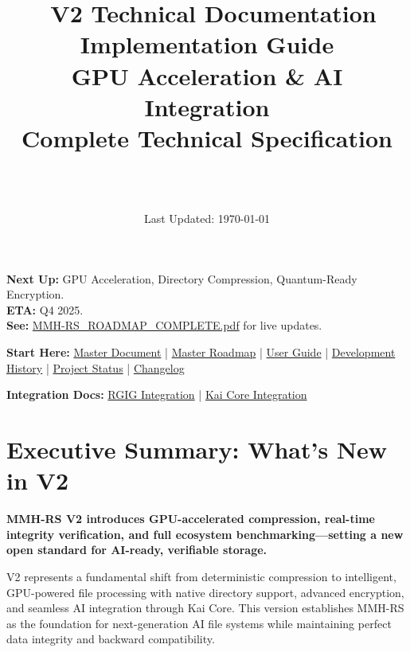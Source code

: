 \documentclass[12pt,a4paper]{article}
\title{\Huge\textbf{\project\ V2 Technical Documentation}\\[0.5cm]
\Large\textbf{Implementation Guide}\\[0.3cm]
\large GPU Acceleration \& AI Integration\\[0.5cm]
\large Complete Technical Specification}
\author{\Large\authorname\\[0.2cm]\email\\[0.2cm]\github}
\date{\large Last Updated: \today}
\begin{document}
\maketitle
\thispagestyle{empty}

\begin{tcolorbox}[colback=orange!10,colframe=orange!50,title=\textbf{V2 GPU/Quantum Features in Active Development}]
\textbf{Next Up:} GPU Acceleration, Directory Compression, Quantum-Ready Encryption.\\
\textbf{ETA:} Q4 2025.\\
\textbf{See:} \href{MMH-RS_ROADMAP_COMPLETE.pdf}{MMH-RS\_ROADMAP\_COMPLETE.pdf} for live updates.
\end{tcolorbox}

\begin{tcolorbox}[colback=blue!10,colframe=blue!50,title=\textbf{Full Documentation Suite}]
\textbf{Start Here:} \href{MMH-RS_MASTER_DOCUMENT.pdf}{Master Document} | \href{MMH-RS_ROADMAP_COMPLETE.pdf}{Master Roadmap} | \href{USER_GUIDE.md}{User Guide} | \href{DEVELOPMENT_HISTORY.md}{Development History} | \href{PROJECT_STATUS.md}{Project Status} | \href{CHANGELOG.md}{Changelog}

\textbf{Integration Docs:} \href{RGIG_INTEGRATION_COMPLETE.pdf}{RGIG Integration} | \href{KAI_CORE_INTEGRATION_COMPLETE.pdf}{Kai Core Integration}
\end{tcolorbox}

\tableofcontents
\newpage

\section{Executive Summary: What's New in V2}

\begin{tcolorbox}[colback=v2blue!10,colframe=v2blue!50,title=\textbf{MMH-RS V2 Technical Summary}]
\textbf{MMH-RS V2 introduces GPU-accelerated compression, real-time integrity verification, and full ecosystem benchmarking—setting a new open standard for AI-ready, verifiable storage.}

V2 represents a fundamental shift from deterministic compression to intelligent, GPU-powered file processing with native directory support, advanced encryption, and seamless AI integration through Kai Core. This version establishes MMH-RS as the foundation for next-generation AI file systems while maintaining perfect data integrity and backward compatibility.
\end{tcolorbox}
\end{document}
